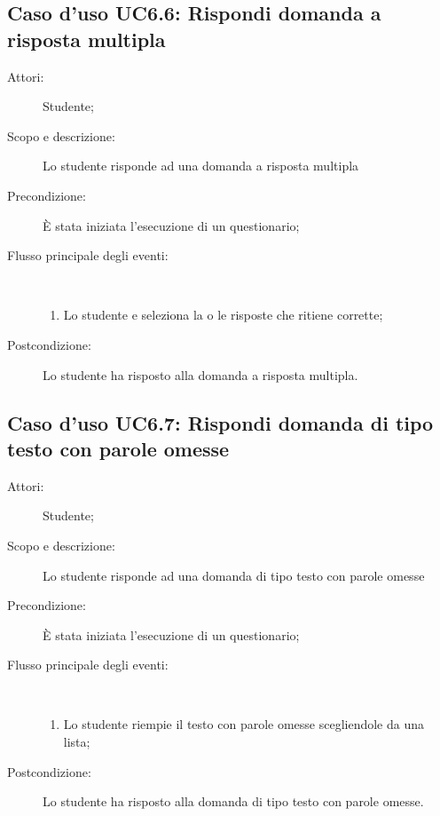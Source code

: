 \subsection{Caso d'uso UC6.6: Rispondi domanda a risposta multipla}\begin{description}
\item[Attori:] Studente;
\item[Scopo e descrizione:] Lo studente risponde ad una domanda a risposta multipla
      \item[Precondizione:] È stata iniziata l'esecuzione di un questionario;

        \item[Flusso principale degli eventi:] \ 
 \begin{enumerate}
          \item Lo studente e seleziona la o le risposte che ritiene corrette;

      \end{enumerate}
    \item[Postcondizione:] Lo studente ha risposto alla domanda a risposta multipla.
  \end{description}
\hypertarget{UC6.7}{}
\subsection{Caso d'uso UC6.7: Rispondi domanda di tipo testo con parole omesse}\begin{description}
\item[Attori:] Studente;
\item[Scopo e descrizione:] Lo studente risponde ad una domanda di tipo testo con parole omesse
      \item[Precondizione:] È stata iniziata l'esecuzione di un questionario;

        \item[Flusso principale degli eventi:] \ 
 \begin{enumerate}
          \item Lo studente riempie il testo con parole omesse scegliendole da una lista;

      \end{enumerate}
    \item[Postcondizione:] Lo studente ha risposto alla domanda di tipo testo con parole omesse.
  \end{description}
\hypertarget{UC6.8}{}

